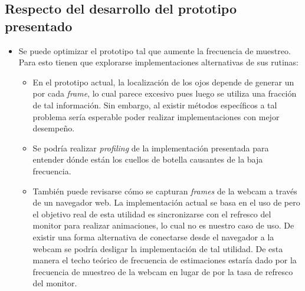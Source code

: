 \subsection{Respecto del desarrollo del prototipo presentado}

  \begin{itemize}
    \item
      Se puede optimizar el prototipo tal que aumente la frecuencia de
      muestreo.
      Para esto tienen que explorarse implementaciones alternativas de sus
      rutinas:
      \begin{itemize}

        \item
          En el prototipo actual, la localización de los ojos depende de
          generar un \facemesh por cada \textit{frame}, lo cual parece
          excesivo pues luego se utiliza una fracción de tal información.
          Sin embargo, al existir métodos específicos a tal problema
          \cite{hansen_2009_eye_of_the_beholder} sería esperable poder realizar
          implementaciones con mejor desempeño.
  
        \item
          Se podría realizar \textit{profiling} de la implementación presentada
          para entender dónde están los cuellos de botella causantes de la
          baja frecuencia. 

  
        \item
          También puede revisarse cómo se capturan \textit{frames} de la webcam a través de un navegador web.
          La implementación actual se basa en el uso de \raf pero el objetivo
          real de esta utilidad es sincronizarse con el refresco del monitor
          para realizar animaciones, lo cual no es nuestro caso de uso.
          De existir una forma alternativa de conectarse desde el navegador a
          la webcam se podría desligar la implementación de tal utilidad.
          De esta manera el techo teórico de frecuencia de estimaciones estaría
          dado por la frecuencia de muestreo de la webcam en lugar de por la
          tasa de refresco del monitor.

      \end{itemize}
  

\end{itemize}
